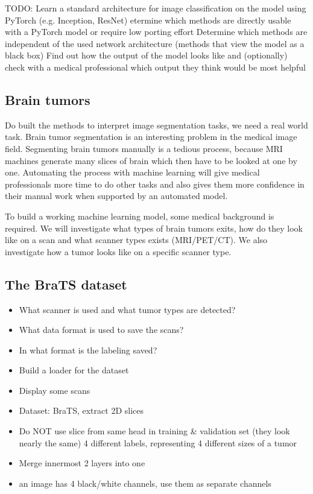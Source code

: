 TODO:
Learn a standard architecture for image classification on the model using PyTorch (e.g. Inception, ResNet)
etermine which methods are directly usable with a PyTorch model or require low porting effort
Determine which methods are independent of the used network architecture (methods that view the model as a black box)
Find out how the output of the model looks like and (optionally) check with a medical professional which output they think would be most helpful

\subsection{Brain tumors}
Do built the methods to interpret image segmentation tasks, we need a real world task. Brain tumor segmentation is an interesting problem in the medical image field. Segmenting brain tumors manually is a tedious process, because MRI machines generate many slices of brain which then have to be looked at one by one. Automating the process with machine learning will give medical professionals more time to do other tasks and also gives them more confidence in their manual work when supported by an automated model.

To build a working machine learning model, some medical background is required. We will investigate what types of brain tumors exits, how do they look like on a scan and what scanner types exists (MRI/PET/CT). We also investigate how a tumor looks like on a specific scanner type.

\subsection{The BraTS dataset}
\begin{itemize}
    \item What scanner is used and what tumor types are detected?
    \item What data format is used to save the scans?
    \item In what format is the labeling saved?
    \item Build a loader for the dataset
    \item Display some scans
    \item Dataset: BraTS, extract 2D slices
    \item Do NOT use slice from same head in training \& validation set (they look nearly the same) 4 different labels, representing 4 different sizes of a tumor
    \item Merge innermost 2 layers into one
    \item an image has 4 black/white channels, use them as separate channels
\end{itemize}

